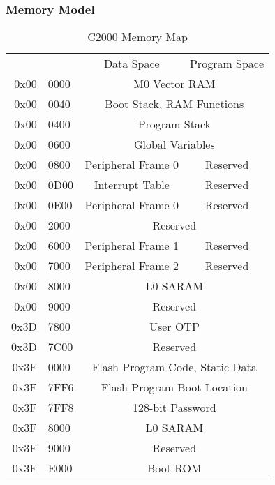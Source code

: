 \subsubsection{Memory Model}
\begin{wraptable}{r}{8cm}
	\vspace{-18pt}
	\caption{C2000 Memory Map}
	\label{tab:memory-map}
	\centering
	{\footnotesize
	\begin{tabular}{rl|c|c|}
		\hline\hline
		&& Data Space & Program Space \\ \cline{3-4}
		0x00&0000 & \multicolumn{2}{c|}{M0 Vector RAM} \\ \cline{3-4}
		0x00&0040 & \multicolumn{2}{c|}{Boot Stack, RAM Functions} \\ \cline{3-4}
		0x00&0400 & \multicolumn{2}{c|}{Program Stack} \\ \cline{3-4}
		0x00&0600 & \multicolumn{2}{c|}{Global Variables} \\ \cline{3-4}
		0x00&0800 & Peripheral Frame 0 & Reserved \\ \cline{3-4}
		0x00&0D00 & Interrupt Table & Reserved \\ \cline{3-4}
		0x00&0E00 & Peripheral Frame 0 & Reserved \\ \cline{3-4}
		0x00&2000 & \multicolumn{2}{c|}{Reserved} \\ \cline{3-4}
		0x00&6000 & Peripheral Frame 1 & Reserved \\ \cline{3-4}
		0x00&7000 & Peripheral Frame 2 & Reserved \\ \cline{3-4}
		0x00&8000 & \multicolumn{2}{c|}{L0 SARAM} \\ \cline{3-4}
		0x00&9000 & \multicolumn{2}{c|}{Reserved} \\ \cline{3-4}
		0x3D&7800 & \multicolumn{2}{c|}{User OTP} \\ \cline{3-4}
		0x3D&7C00 & \multicolumn{2}{c|}{Reserved} \\ \cline{3-4}
		0x3F&0000 & \multicolumn{2}{c|}{Flash Program Code, Static Data} \\ \cline{3-4}
		0x3F&7FF6 & \multicolumn{2}{c|}{Flash Program Boot Location} \\ \cline{3-4}
		0x3F&7FF8 & \multicolumn{2}{c|}{128-bit Password} \\ \cline{3-4}
		0x3F&8000 & \multicolumn{2}{c|}{L0 SARAM} \\ \cline{3-4}
		0x3F&9000 & \multicolumn{2}{c|}{Reserved} \\ \cline{3-4}
		0x3F&E000 & \multicolumn{2}{c|}{Boot ROM} \\ \cline{3-4}
		\hline
	\end{tabular}
	}
\end{wraptable}
